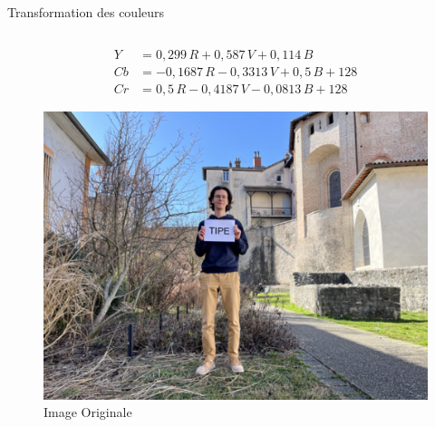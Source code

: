 \documentclass[xcolor=dvipsnames]{beamer}
\begin{document}
\begin{frame}{Transformation des couleurs}

    \begin{columns}

        \begin{column}{0.4\textwidth}
            \tiny
            \begin{align*}
                Y &= 0,299 \, R + 0,587 \, V + 0,114 \, B \\
                Cb &= -0,1687 \, R - 0,3313 \, V + 0,5 \, B + 128 \\
                Cr &= 0,5 \, R - 0,4187 \, V - 0,0813 \, B + 128
            \end{align*}
            \begin{figure}
                \centering
                \includegraphics[width=1\linewidth]{principale_1000_750_smooth.jpg}
                \caption{Image Originale}
            \end{figure}
        \end{column}
        

\end{columns}
\end{frame}
\end{document}
